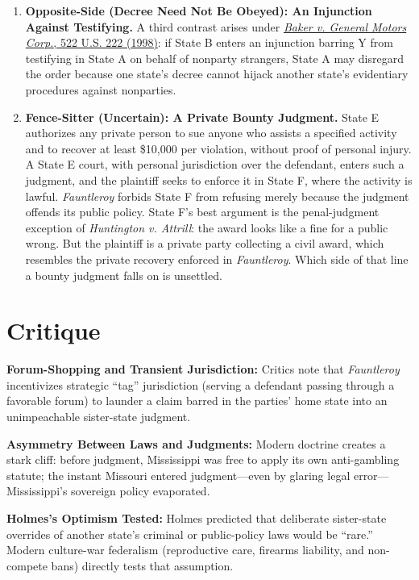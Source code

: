 \documentclass[12pt]{article}
\begin{document}
\begin{enumerate}
\item \textbf{Opposite-Side (Decree Need Not Be Obeyed): An Injunction Against Testifying.} A third contrast arises under \href{https://supreme.justia.com/cases/federal/us/522/222/}{\textit{Baker v. General Motors Corp.}, 522 U.S. 222 (1998)}: if State B enters an injunction barring Y from testifying in State A on behalf of nonparty strangers, State A may disregard the order because one state's decree cannot hijack another state's evidentiary procedures against nonparties.

\item \textbf{Fence-Sitter (Uncertain): A Private Bounty Judgment.} State E authorizes any private person to sue anyone who assists a specified activity and to recover at least \$10,000 per violation, without proof of personal injury. A State E court, with personal jurisdiction over the defendant, enters such a judgment, and the plaintiff seeks to enforce it in State F, where the activity is lawful. \textit{Fauntleroy} forbids State F from refusing merely because the judgment offends its public policy. State F's best argument is the penal-judgment exception of \textit{Huntington v. Attrill}: the award looks like a fine for a public wrong. But the plaintiff is a private party collecting a civil award, which resembles the private recovery enforced in \textit{Fauntleroy}. Which side of that line a bounty judgment falls on is unsettled.

\end{enumerate}

\section{Critique}
\textbf{Forum-Shopping and Transient Jurisdiction:} Critics note that \textit{Fauntleroy} incentivizes strategic ``tag'' jurisdiction (serving a defendant passing through a favorable forum) to launder a claim barred in the parties' home state into an unimpeachable sister-state judgment.

\textbf{Asymmetry Between Laws and Judgments:} Modern doctrine creates a stark cliff: before judgment, Mississippi was free to apply its own anti-gambling statute; the instant Missouri entered judgment---even by glaring legal error---Mississippi's sovereign policy evaporated.

\textbf{Holmes's Optimism Tested:} Holmes predicted that deliberate sister-state overrides of another state's criminal or public-policy laws would be ``rare.'' Modern culture-war federalism (reproductive care, firearms liability, and non-compete bans) directly tests that assumption.
\end{document}
